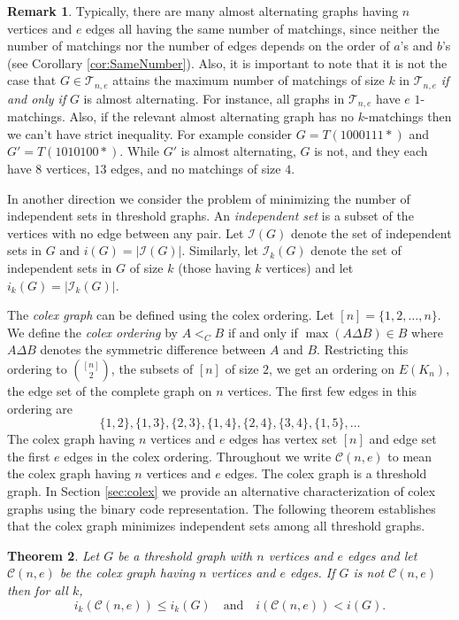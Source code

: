 \documentclass[12pt]{amsart}
\theoremstyle{plain}
\newtheorem{thm}{Theorem}[section]
\theoremstyle{definition}
\newtheorem{rmk}[thm]{Remark}
\newcommand{\cI}{\mathcal{I}}
\newcommand{\cT}{\mathcal{T}}
\newcommand{\cC}{\mathcal{C}}
\begin{document}
\begin{rmk}
Typically, there are many almost alternating graphs having $n$ vertices and $e$ edges all having the same number of matchings, since neither the number of matchings nor the number of edges depends on the order of $a$'s and $b$'s (see Corollary \ref{cor:SameNumber}).   Also, it is important to note that it is not the case that $G\in\cT_{n,e}$ attains the maximum number of matchings of size $k$ in $\cT_{n,e}$ \emph{if and only if} $G$ is almost alternating.  For instance, all graphs in $\cT_{n,e}$ have $e$ $1$-matchings.  Also, if the relevant almost alternating graph has no $k$-matchings then we can't have strict inequality.  For example consider $G = T(1000111*)$ and $G' =T(1010100*)$. While $G'$ is almost alternating, $G$ is not, and they each have $8$ vertices, $13$ edges, and no matchings of size $4$.
\end{rmk}


In another direction we consider the problem of minimizing the number of independent sets in threshold graphs.  An \emph{independent set} is a subset of the vertices with no edge between any pair.  Let $\cI(G)$ denote the set of independent sets in $G$ and $i(G) = |\cI(G)|$.  Similarly, let $\cI_k(G)$ denote the set of independent sets in $G$ of size $k$ (those having $k$ vertices) and let $i_k(G) = |\cI_k(G)|$.


The \emph{colex graph} can be defined using the colex ordering.  Let $[n] = \{1,2,\dots, n\}$.  We define the \emph{colex ordering} by $A<_C B$ if and only if $\max(A\Delta B) \in B$ where $A\Delta B$ denotes the symmetric difference between $A$ and $B$.  Restricting this ordering to $\binom{[n]}{2}$, the subsets of $[n]$ of size $2$, we get an ordering on $E(K_n)$, the edge set of the complete graph on $n$ vertices.  The first few edges in this ordering are 
\[ \{1,2\}, \{1,3\}, \{2,3\}, \{1,4\}, \{2,4\}, \{3,4\}, \{1,5\}, \dots\]
The colex graph having $n$ vertices and $e$ edges has vertex set $[n]$ and edge set the first $e$ edges in the colex ordering.  Throughout we write $\cC(n,e)$ to mean the colex graph having $n$ vertices and $e$ edges. The colex graph is a threshold graph. In Section \ref{sec:colex}  we provide an alternative characterization of colex graphs using the binary code representation.  The following theorem establishes that the colex graph minimizes independent sets among all threshold graphs.

\begin{thm}\label{thm:MinIndSets}
Let $G$ be a threshold graph with $n$ vertices and $e$ edges  and let $\cC(n,e)$ be the colex graph having $n$ vertices and $e$ edges.  If $G$ is not $\mathcal{C}(n,e)$ then for all $k$,
	\[i_k(\mathcal{C}(n,e)) \leq i_k(G) \quad\text{and}\quad i(\mathcal{C}(n,e)) < i(G).\]
\end{thm}
\end{document}
